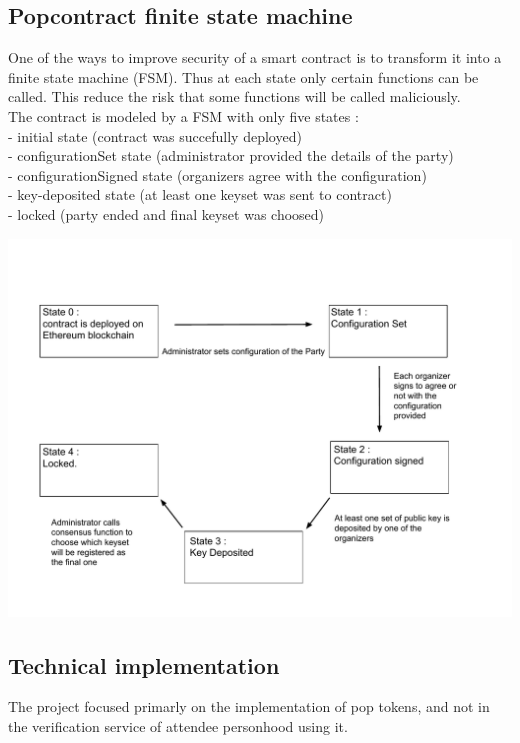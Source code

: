 \documentclass[11pt, a4paper, twoside, openright]{book} %
\begin{document}
\subsection{Popcontract finite state machine}
One of the ways to improve security of a smart contract is to transform it into a finite state machine (FSM). Thus at each state only certain functions can be called. This reduce the risk that some functions will be called maliciously.\\ The contract is modeled by a FSM with only five states : \\- initial state (contract was succefully deployed)\\ - configurationSet state (administrator provided the details of the party) \\ - configurationSigned state (organizers agree with the configuration) \\ - key-deposited state (at least one keyset was sent to contract)\\ - locked (party ended and final keyset was choosed)

\begin{minipage}{1\linewidth}
 \includegraphics[scale = 0.67]{fsm.pdf}
\end{minipage}%

\subsection{Technical implementation}
The project focused primarly on the implementation of pop tokens, and not in the verification service of attendee personhood using it.
\end{document}
